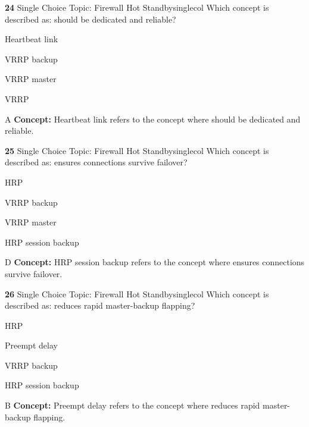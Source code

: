 \documentclass[10pt,a4paper]{article}
\begin{document}
\begin{qcard}{\color{white}\textbf{24} \hfill \small Single Choice \textbar{} Topic: Firewall Hot Standby}{singlecol}
Which concept is described as: should be dedicated and reliable?

\begin{qoptions}
\item Heartbeat link
\item VRRP backup
\item VRRP master
\item VRRP
\end{qoptions}
\begin{explainbox}{A}
\textbf{Concept:} Heartbeat link refers to the concept where should be dedicated and reliable.
\end{explainbox}
\end{qcard}

\begin{qcard}{\color{white}\textbf{25} \hfill \small Single Choice \textbar{} Topic: Firewall Hot Standby}{singlecol}
Which concept is described as: ensures connections survive failover?

\begin{qoptions}
\item HRP
\item VRRP backup
\item VRRP master
\item HRP session backup
\end{qoptions}
\begin{explainbox}{D}
\textbf{Concept:} HRP session backup refers to the concept where ensures connections survive failover.
\end{explainbox}
\end{qcard}

\begin{qcard}{\color{white}\textbf{26} \hfill \small Single Choice \textbar{} Topic: Firewall Hot Standby}{singlecol}
Which concept is described as: reduces rapid master-backup flapping?

\begin{qoptions}
\item HRP
\item Preempt delay
\item VRRP backup
\item HRP session backup
\end{qoptions}
\begin{explainbox}{B}
\textbf{Concept:} Preempt delay refers to the concept where reduces rapid master-backup flapping.
\end{explainbox}
\end{qcard}
\end{document}
